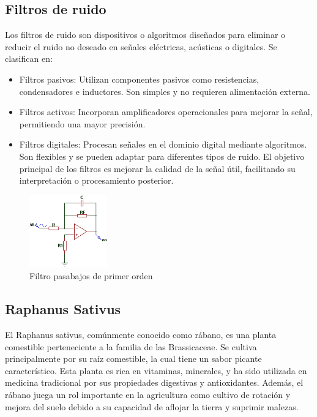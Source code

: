 \documentclass[conference]{IEEEtran}
\begin{document}
	\subsection{Filtros de ruido}
	Los filtros de ruido son dispositivos o algoritmos diseñados para eliminar o reducir el ruido no deseado en señales eléctricas, acústicas o digitales. Se clasifican en:
	
	\begin{itemize}
		\item Filtros pasivos: Utilizan componentes pasivos como resistencias, condensadores e inductores. Son simples y no requieren alimentación externa.
		\item Filtros activos: Incorporan amplificadores operacionales para mejorar la señal, permitiendo una mayor precisión.
		\item Filtros digitales: Procesan señales en el dominio digital mediante algoritmos. Son flexibles y se pueden adaptar para diferentes tipos de ruido. El objetivo principal de los filtros es mejorar la calidad de la señal útil, facilitando su interpretación o procesamiento posterior.
	\end{itemize}
	
	\begin{figure}[h]
		\centering
		\includegraphics[width=0.3\textwidth]{media/filtro-pasa-bajos.png}
		\caption{Filtro pasabajos de primer orden}
		\label{fig:filtro-pasabajos}
	\end{figure}
	
	\subsection{Raphanus Sativus}
	El Raphanus sativus, comúnmente conocido como rábano, es una planta comestible perteneciente a la familia de las Brassicaceae. Se cultiva principalmente por su raíz comestible, la cual tiene un sabor picante característico. Esta planta es rica en vitaminas, minerales, y ha sido utilizada en medicina tradicional por sus propiedades digestivas y antioxidantes. Además, el rábano juega un rol importante en la agricultura como cultivo de rotación y mejora del suelo debido a su capacidad de aflojar la tierra y suprimir malezas.
	
\end{document}
